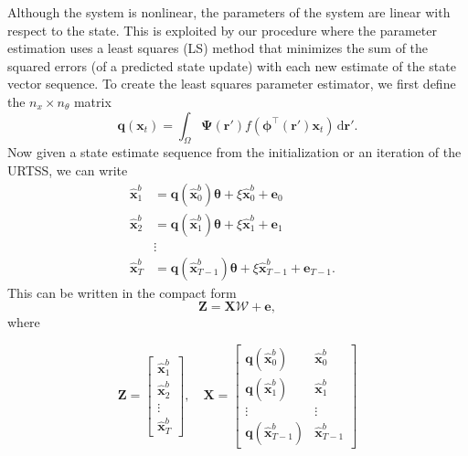 \documentclass[5p,authoryear]{elsarticle}
\begin{document}
Although the system is nonlinear, the parameters of the system are linear with respect to the state. This is exploited by our procedure where the parameter estimation uses a least squares (LS) method that minimizes the sum of the squared errors (of a predicted state update) with each new estimate of the state vector sequence. To create the least squares parameter estimator, we first define the $n_x \times n_{\theta}$ matrix
\begin{equation}
	\mathbf{q}(\mathbf{x}_t) = \int_\Omega \boldsymbol{\Psi}(\mathbf{r}') f(\boldsymbol{\phi}^{\top}(\mathbf{r}')\mathbf{x}_t) \,\textrm{d}\mathbf{r}'.
\end{equation}
Now given a state estimate sequence from the initialization or an iteration of the URTSS, we can write
\begin{align*}
	 \hat{\mathbf x}^b_{1} &= \mathbf{q}(\hat{\mathbf x}^b_0) \boldsymbol{\theta}+\xi\hat{\mathbf x}^b_0+\mathbf e_0 \\
	\hat{\mathbf x}^b_{2} &= \mathbf{q}(\hat{\mathbf x}^b_1) \boldsymbol{\theta}+\xi\hat{\mathbf x}^b_1+\mathbf e_1  \\
	&\vdots& \\
	\hat{\mathbf x}^b_{T}&= \mathbf{q}(\hat{\mathbf x}^b_{T-1}) \boldsymbol{\theta}+\xi\hat{\mathbf x}^b_{T-1}+\mathbf e_{T-1}. 
\end{align*}
This can be written in the compact form
\begin{equation}
	\mathbf Z=\mathbf X \mathcal W+\mathbf{e}, 
\end{equation}
where
\begin{small}
\begin{equation*}
	\mathbf Z=\left[
	\begin{array}{cccc}
		\hat{\mathbf x}^b_{1}\\
		\hat{\mathbf x}^b_{2}\\
		\vdots\\
		\hat{\mathbf x}^b_{T}
	\end{array}
	\right],\quad \mathbf X=\left[
	\begin{array}{cccc}
		\mathbf q(\hat{\mathbf x}^b_0)& \hat{\mathbf x}^b_{0}\\
		\mathbf q(\hat{\mathbf x}^b_1)& \hat{\mathbf x}^b_{1}\\
		\vdots & \vdots\\
		\mathbf q(\hat{\mathbf x}^b_{T-1})& \hat{\mathbf x}^b_{T-1}
	\end{array}
	\right] 
\end{equation*}
\end{small}
\end{document}
